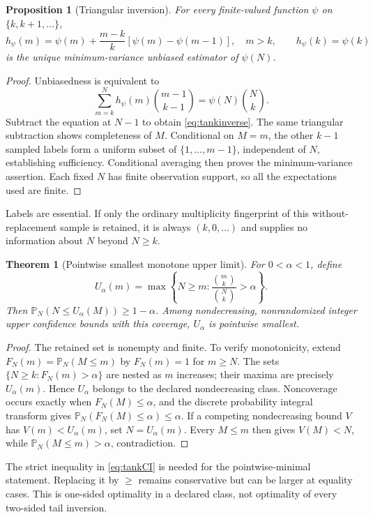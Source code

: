 \documentclass[11pt]{article}
\numberwithin{equation}{section}
\newtheorem{theorem}{Theorem}[section]
\newtheorem{proposition}[proposition]{Proposition}
\theoremstyle{definition}
\theoremstyle{remark}
\newcommand{\Pp}{\mathbb P}
\begin{document}
\begin{proposition}[Triangular inversion]\label{prop:tankunbiased}
For every finite-valued function $\psi$ on $\{k,k+1,\ldots\}$,
\begin{equation}\label{eq:tankinverse}
 h_\psi(m)=\psi(m)+\frac{m-k}{k}[\psi(m)-\psi(m-1)],\quad m>k,
 \qquad h_\psi(k)=\psi(k)
\end{equation}
is the unique minimum-variance unbiased estimator of $\psi(N)$.
\end{proposition}
\begin{proof}
Unbiasedness is equivalent to
\[
 \sum_{m=k}^N h_\psi(m)\binom{m-1}{k-1}=\psi(N)\binom Nk.
\]
Subtract the equation at $N-1$ to obtain \eqref{eq:tankinverse}. The same triangular subtraction shows completeness of $M$. Conditional on $M=m$, the other $k-1$ sampled labels form a uniform subset of $\{1,\ldots,m-1\}$, independent of $N$, establishing sufficiency. Conditional averaging then proves the minimum-variance assertion. Each fixed $N$ has finite observation support, so all the expectations used are finite.
\end{proof}
Labels are essential. If only the ordinary multiplicity fingerprint of this without-replacement sample is retained, it is always $(k,0,\ldots)$ and supplies no information about $N$ beyond $N\ge k$.

\begin{theorem}[Pointwise smallest monotone upper limit]\label{thm:tankupper}
For $0<\alpha<1$, define
\begin{equation}\label{eq:tankCI}
 U_\alpha(m)=\max\left\{N\ge m:\frac{\binom mk}{\binom Nk}>\alpha\right\}.
\end{equation}
Then $\Pp_N(N\le U_\alpha(M))\ge1-\alpha$. Among nondecreasing, nonrandomized integer upper confidence bounds with this coverage, $U_\alpha$ is pointwise smallest.
\end{theorem}
\begin{proof}
The retained set is nonempty and finite. To verify monotonicity, extend $F_N(m)=\Pp_N(M\le m)$ by $F_N(m)=1$ for $m\ge N$. The sets $\{N\ge k:F_N(m)>\alpha\}$ are nested as $m$ increases; their maxima are precisely $U_\alpha(m)$. Hence $U_\alpha$ belongs to the declared nondecreasing class. Noncoverage occurs exactly when $F_N(M)\le\alpha$, and the discrete probability integral transform gives $\Pp_N(F_N(M)\le\alpha)\le\alpha$. If a competing nondecreasing bound $V$ has $V(m)<U_\alpha(m)$, set $N=U_\alpha(m)$. Every $M\le m$ then gives $V(M)<N$, while $\Pp_N(M\le m)>\alpha$, contradiction.
\end{proof}
The strict inequality in \eqref{eq:tankCI} is needed for the pointwise-minimal statement. Replacing it by $\ge$ remains conservative but can be larger at equality cases. This is one-sided optimality in a declared class, not optimality of every two-sided tail inversion.
\end{document}
